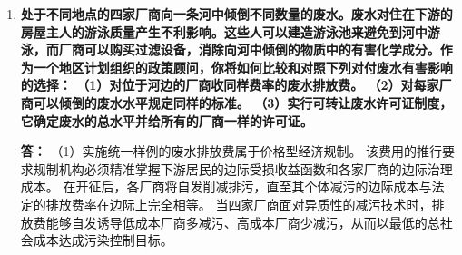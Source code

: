 \begin{enumerate}[label=\textbf{\arabic*.}, leftmargin=*]
\begin{center}
		\end{center}
		
		（4）资源配置最优的核心逻辑是追求社会总剩余（总收益与总成本之差）的极大化，而非两者的数值对等。
		根据微观数学优化原理，极大化总剩余的充要条件是其一阶导数归零，即最后一单位减污带来的边际社会收益必须恰好冲平其边际社会成本。
		若错误地将目标锚定在总收益等于总成本的交点上，意味着将社会净收益榨取至零，从而导致了减排过度，引发了严重的社会资源低效率浪费。
		
		\item \textbf{处于不同地点的四家厂商向一条河中倾倒不同数量的废水。废水对住在下游的房屋主人的游泳质量产生不利影响。这些人可以建造游泳池来避免到河中游泳，而厂商可以购买过滤设备，消除向河中倾倒的物质中的有害化学成分。作为一个地区计划组织的政策顾问，你将如何比较和对照下列对付废水有害影响的选择：
			（1）对位于河边的厂商收同样费率的废水排放费。
			（2）对每家厂商可以倾倒的废水水平规定同样的标准。
			（3）实行可转让废水许可证制度，它确定废水的总水平并给所有的厂商一样的许可证。}
		
		\textbf{答：} （1）实施统一样例的废水排放费属于价格型经济规制。
		该费用的推行要求规制机构必须精准掌握下游居民的边际受损收益函数和各家厂商的边际治理成本。
		在开征后，各厂商将自发削减排污，直至其个体减污的边际成本与法定的排放费率在边际上完全相等。
		当四家厂商面对异质性的减污技术时，排放费能够自发诱导低成本厂商多减污、高成本厂商少减污，从而以最低的总社会成本达成污染控制目标。
		

\end{enumerate}
